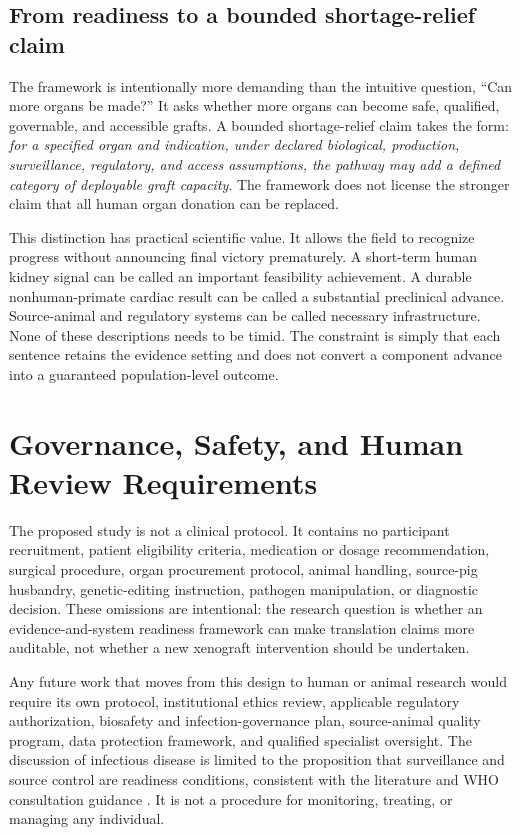 \documentclass[conference]{IEEEtran}
\begin{document}
\subsection{From readiness to a bounded shortage-relief claim}

The framework is intentionally more demanding than the intuitive question, ``Can more organs be made?'' It asks whether more organs can become safe, qualified, governable, and accessible grafts. A bounded shortage-relief claim takes the form: \emph{for a specified organ and indication, under declared biological, production, surveillance, regulatory, and access assumptions, the pathway may add a defined category of deployable graft capacity}. The framework does not license the stronger claim that all human organ donation can be replaced.

This distinction has practical scientific value. It allows the field to recognize progress without announcing final victory prematurely. A short-term human kidney signal can be called an important feasibility achievement. A durable nonhuman-primate cardiac result can be called a substantial preclinical advance. Source-animal and regulatory systems can be called necessary infrastructure. None of these descriptions needs to be timid. The constraint is simply that each sentence retains the evidence setting and does not convert a component advance into a guaranteed population-level outcome.

\section{Governance, Safety, and Human Review Requirements}

The proposed study is not a clinical protocol. It contains no participant recruitment, patient eligibility criteria, medication or dosage recommendation, surgical procedure, organ procurement protocol, animal handling, source-pig husbandry, genetic-editing instruction, pathogen manipulation, or diagnostic decision. These omissions are intentional: the research question is whether an evidence-and-system readiness framework can make translation claims more auditable, not whether a new xenograft intervention should be undertaken.

Any future work that moves from this design to human or animal research would require its own protocol, institutional ethics review, applicable regulatory authorization, biosafety and infection-governance plan, source-animal quality program, data protection framework, and qualified specialist oversight. The discussion of infectious disease is limited to the proposition that surveillance and source control are readiness conditions, consistent with the literature and WHO consultation guidance \cite{fishman2024,hawthorne2019}. It is not a procedure for monitoring, treating, or managing any individual.
\end{document}
